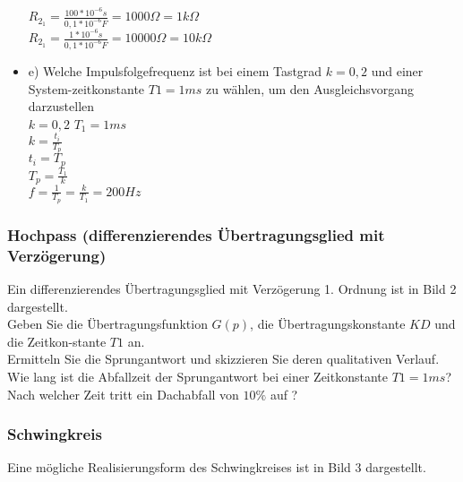 \begin{itemize}
$R_{2_{1}}=\frac{100*10^{-6}s}{0,1*10^{-6}F}=1000\Omega=1k\Omega$\\
$R_{2_{1}}=\frac{1*10^{-6}s}{0,1*10^{-6}F}=10000\Omega=10k\Omega$\\

\item e)    Welche Impulsfolgefrequenz ist bei einem Tastgrad $k= 0,2$ und einer System-zeitkonstante $T1 = 1 ms$ zu wählen, um den Ausgleichsvorgang darzustellen\\
\newline
$k=0,2$
$T_{1}=1ms$\\
\newline
$k=\frac{t_{i}}{T_{p}}$\\
$t_{i}=T_{p}$\\
$T_{p}=\frac{T_{1}}{k}$\\
$f=\frac{1}{T_{p}}=\frac{k}{T_{1}}=200Hz$

\end{itemize}

\subsubsection{Hochpass (differenzierendes Übertragungsglied mit Verzögerung)}

Ein differenzierendes Übertragungsglied mit Verzögerung 1. Ordnung ist in Bild 2 dargestellt.\\
Geben  Sie  die  Übertragungsfunktion $G(p)$,  die  Übertragungskonstante  $KD$ und die Zeitkon-stante $T1$ an.\\ 
Ermitteln Sie die Sprungantwort und skizzieren Sie deren qualitativen Verlauf.\\ 
Wie lang ist die Abfallzeit der Sprungantwort bei einer Zeitkonstante $T1 = 1 ms$?\\
\newline
Nach welcher Zeit tritt ein Dachabfall von $10\%$ auf ?\\

\subsubsection{Schwingkreis}

Eine mögliche Realisierungsform des Schwingkreises ist in Bild 3 dargestellt.\\

